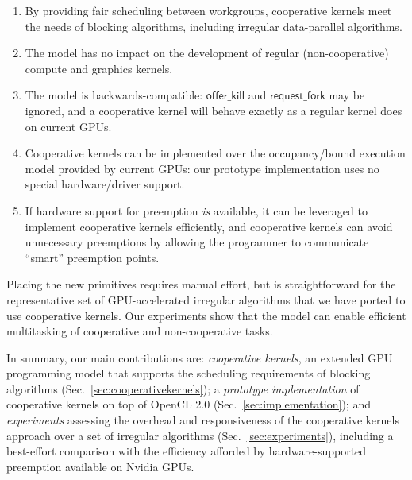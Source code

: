 \documentclass[sigconf]{acmart}
\newcommand{\cutthree}[1]{}
\newcommand{\mysec}{Sec.~}
\newcommand{\offerfork}{\mathsf{request\_fork}}
\newcommand{\offerkill}{\mathsf{offer\_kill}}
\begin{document}
\begin{enumerate}[leftmargin=*]

\item By providing fair scheduling between workgroups, cooperative
  kernels meet the needs of blocking algorithms, including irregular
  data-parallel algorithms.

\item The model has no impact on the development of regular
  (non-cooperative) compute and graphics kernels.

\item The model is backwards-compatible: $\offerkill$ and $\offerfork$ may be ignored, and a cooperative kernel will behave
  exactly as a regular kernel does on current GPUs.

\item Cooperative kernels can be implemented over the occupancy\-/bound
  execution model provided by current GPUs: our prototype implementation uses no special hardware/driver support.

\item If hardware support for preemption \emph{is} available, it can be leveraged to implement cooperative kernels efficiently, and cooperative kernels can avoid unnecessary preemptions by allowing the programmer to communicate ``smart'' preemption points.

\end{enumerate}

Placing the new primitives requires manual effort, but is straightforward for the representative set of
GPU-accelerated irregular algorithms that we have ported to use cooperative kernels.  Our experiments show that the model can enable efficient multitasking of cooperative and non-cooperative tasks.

In summary, our main contributions are:
\emph{cooperative kernels}, an extended GPU programming model that supports the scheduling requirements of blocking algorithms (\mysec\ref{sec:cooperativekernels}); a \emph{prototype implementation} of cooperative
  kernels on top of OpenCL 2.0
  (\mysec\ref{sec:implementation}); and \emph{experiments} assessing the overhead and responsiveness of the cooperative kernels approach over a set of irregular algorithms \cutthree{across three GPUs} (\mysec\ref{sec:experiments}), including a best-effort comparison with the efficiency afforded by hardware-supported preemption available on Nvidia GPUs.
\end{document}
